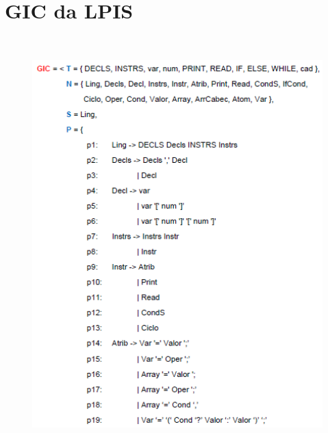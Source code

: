 \documentclass{report}
\begin{document}
\cleardoublepage

\chapter{GIC da LPIS} \

\begin{figure}[h]
\centering
\includegraphics[width=120mm, scale=0.5]{gic1.PNG}
\end{figure}
\end{document}
